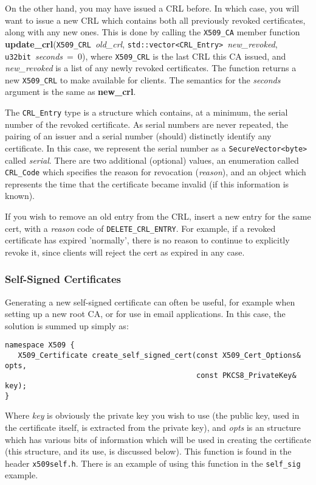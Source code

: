 \documentclass{article}
\newcommand{\filename}[1]{\texttt{#1}}
\newcommand{\function}[1]{\textbf{#1}}
\newcommand{\type}[1]{\texttt{#1}}
\renewcommand{\arg}[1]{\textsl{#1}}
\begin{document}
On the other hand, you may have issued a CRL before. In which case, you will
want to issue a new CRL which contains both all previously revoked
certificates, along with any new ones. This is done by calling the
\type{X509\_CA} member function
\function{update\_crl}(\type{X509\_CRL}~\arg{old\_crl},
\type{std::vector<CRL\_Entry>}~\arg{new\_revoked},
\type{u32bit}~\arg{seconds}~=~0), where \type{X509\_CRL} is the last CRL this
CA issued, and \arg{new\_revoked} is a list of any newly revoked certificates.
The function returns a new \type{X509\_CRL} to make available for clients. The
semantics for the \arg{seconds} argument is the same as \function{new\_crl}.

The \type{CRL\_Entry} type is a structure which contains, at a minimum, the
serial number of the revoked certificate. As serial numbers are never repeated,
the pairing of an issuer and a serial number (should) distinctly identify any
certificate. In this case, we represent the serial number as a
\type{SecureVector<byte>} called \arg{serial}. There are two additional
(optional) values, an enumeration called \type{CRL\_Code} which specifies the
reason for revocation (\arg{reason}), and an object which represents the time
that the certificate became invalid (if this information is known).

If you wish to remove an old entry from the CRL, insert a new entry for the
same cert, with a \arg{reason} code of \type{DELETE\_CRL\_ENTRY}. For example,
if a revoked certificate has expired 'normally', there is no reason to continue
to explicitly revoke it, since clients will reject the cert as expired in any
case.

\subsubsection{Self-Signed Certificates}

Generating a new self-signed certificate can often be useful, for example when
setting up a new root CA, or for use in email applications. In this case,
the solution is summed up simply as:

\begin{verbatim}
namespace X509 {
   X509_Certificate create_self_signed_cert(const X509_Cert_Options& opts,
                                            const PKCS8_PrivateKey& key);
}
\end{verbatim}

Where \arg{key} is obviously the private key you wish to use (the public key,
used in the certificate itself, is extracted from the private key), and
\arg{opts} is an structure which has various bits of information which will be
used in creating the certificate (this structure, and its use, is discussed
below). This function is found in the header \filename{x509self.h}. There is an
example of using this function in the \filename{self\_sig} example.
\end{document}

